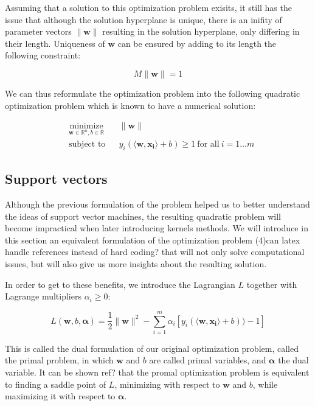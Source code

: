 Assuming that a solution to this optimization problem exisits, it still has the issue that although the solution hyperplane is unique, there is an inifity of parameter vectors $\|\mathbf{w}\|$ resulting in the solution hyperplane, only differing in their length. Uniqueness of $\mathbf{w}$ can be ensured by adding to its length the following constraint:

$$M\|\mathbf{w}\| = 1$$

We can thus reformulate the optimization problem into the following quadratic optimization problem which is known to have a numerical solution:

\begin{equation}
  \begin{aligned}
    &\underset{\mathbf{w} \in \mathbb{R}^n, b \in \mathbb{R}} {\text{minimize}}
    & &\|\mathbf{w}\|\\
    &\text{subject to}
    & &y_i(\langle\mathbf{w},\mathbf{x_i}\rangle + b) \ge 1\ \text{for all}\ i = 1 \dotsc m
  \end{aligned}
\end{equation}

\subsection {Support vectors}

Although the previous formulation of the problem helped us to better understand the ideas of support vector machines, the resulting quadratic problem will become impractical when later introducing kernels methods. We will introduce in this section an equivalent formulation of the optimization problem (4)\textcolor[rgb]{1,0,0}{can latex handle references instead of hard coding?}
  that will not only solve computational issues, but will also give us more insights about the resulting solution.

In order to get to these benefits, we introduce the Lagrangian $L$ together with Lagrange multipliers $\alpha_i \ge 0$:

\begin{equation}
  L(\mathbf{w}, b, \boldsymbol{\alpha}) = \frac{1}{2}\|\mathbf{w}\|^2 - \sum^m_{i=1} \alpha_i[y_i(\langle \mathbf{w}, \mathbf{x_i}\rangle + b)) - 1]
\end{equation}

This is called the dual formulation of our original optimization problem, called the primal problem, in which $\mathbf{w}$ and $b$ are called primal variables, and $\boldsymbol{\alpha}$ the dual variable. It can be shown \textcolor[rgb]{1,0,0}{ref?} that the promal optimization problem is equivalent to finding a saddle point of $L$, minimizing with respect to $\mathbf{w}$ and $b$, while maximizing it with respect to $
\boldsymbol{\alpha}$.

